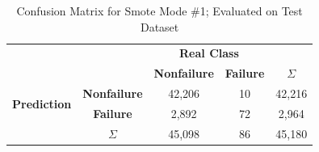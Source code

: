 \documentclass[12pt,a4paper]{article}
\begin{document}
\begin{table}[]
\centering
\begin{tabular}{ccccc}
\multicolumn{2}{c}{} & \multicolumn{2}{c}{\textbf{Real Class}} &  \\
\multicolumn{2}{c}{} & \textbf{Nonfailure} & \textbf{Failure} & \textbf{$\Sigma$} \\ \cline{3-4}
\multirow{2}{*}{\textbf{Prediction}} & \multicolumn{1}{c|}{\textbf{Nonfailure}} & \multicolumn{1}{c|}{42,206} & \multicolumn{1}{c|}{10} & 42,216 \\ \cline{3-4}
 & \multicolumn{1}{c|}{\textbf{Failure}} & \multicolumn{1}{c|}{2,892} & \multicolumn{1}{c|}{72} & 2,964 \\ \cline{3-4}
 & \textbf{$\Sigma$} & 45,098 & 86 & 45,180
\end{tabular}
\caption{Confusion Matrix for Smote Mode \#1; Evaluated on Test Dataset}
\label{tab:confMat_smote1}
\end{table}
\end{document}

